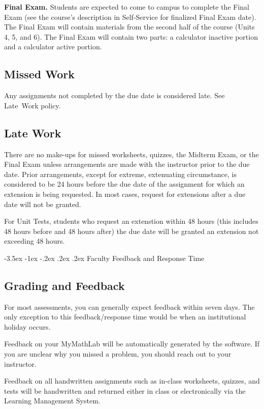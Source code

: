 \documentclass{article}
\makeatletter
\renewcommand\section{\@startsection{section}{1}{0pt}%
  {-3.5ex \@plus -1ex \@minus -.2ex}%
  {.2ex \@plus.2ex}%
  {\normalfont\Large\bfseries}} %
\makeatother
\begin{document}
\textbf{Final Exam.} Students are expected to come to campus to complete the Final Exam (see the course's description in Self-Service for finalized Final Exam date). The Final Exam will contain materials from the second half of the course (Units 4, 5, and 6). The Final Exam will contain two parts: a calculator inactive portion and a calculator active portion.

\subsection{Missed Work}

Any assignments not completed by the due date is considered late. See Late~Work policy.

\subsection{Late Work}

There are no make-ups for missed worksheets, quizzes, the Midterm Exam, or the Final Exam unless arrangements are made with the instructor prior to the due date. Prior arrangements, except for extreme, extenuating circumstance, is considered to be 24 hours before the due date of the assignment for which an extension is being requested. In most cases, request for extensions after a due date will not be granted.

For Unit Tests, students who request an extenstion within 48 hours (this includes 48 hours before and 48 hours after) the due date will be granted an extension not exceeding 48 hours.

\section{Faculty Feedback and Response Time}

\subsection{Grading and Feedback}

For most assessments, you can generally expect feedback within seven days. The only exception to this feedback/response time would be when an institutional holiday occurs.

Feedback on your MyMathLab will be automatically generated by the software. If you are unclear why you missed a problem, you should reach out to your instructor.

Feedback on all handwritten assignments such as in-class worksheets, quizzes, and tests will be handwritten and returned either in class or electronically via the Learning Management System.
\end{document}
